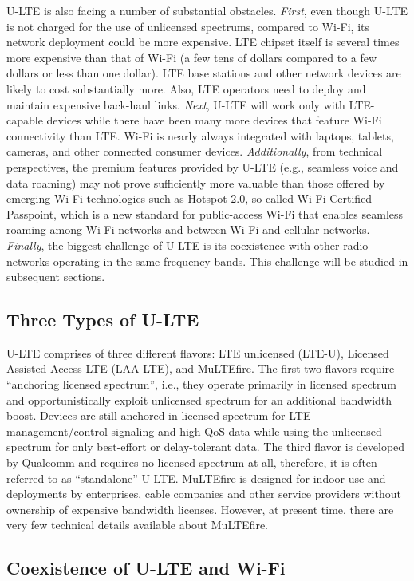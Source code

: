 \documentclass[12pt,onecolumn]{article}
\begin{document}
U-LTE is also facing a number of substantial obstacles. \textit{First}, even though U-LTE is not charged for the use of unlicensed spectrums, compared to Wi-Fi, its network deployment could be more expensive. LTE chipset itself is several times more expensive than that of Wi-Fi (a few tens of dollars compared to a few dollars or less than one dollar). LTE base stations and other network devices are likely to cost substantially more. Also, LTE operators need to deploy and maintain expensive back-haul links. \textit{Next}, U-LTE will work only with LTE-capable devices while there have been many more devices that feature Wi-Fi connectivity than LTE. Wi-Fi is nearly always integrated with laptops, tablets, cameras, and other connected consumer devices. \textit{Additionally}, from technical perspectives, the premium features provided by U-LTE (e.g., seamless voice and data roaming) may not prove sufficiently more valuable than those offered by emerging Wi-Fi technologies such as Hotspot 2.0, so-called Wi-Fi Certified Passpoint, which is a new standard for public-access Wi-Fi that enables seamless roaming among Wi-Fi networks and between Wi-Fi and cellular networks. \textit{Finally}, the biggest challenge of U-LTE is its coexistence with other radio networks operating in the same frequency bands. This challenge will be studied in subsequent sections. 

\subsection{Three Types of U-LTE}

\noindent U-LTE comprises of three different flavors: LTE unlicensed (LTE-U), Licensed Assisted Access LTE (LAA-LTE), and MuLTEfire. The first two flavors require ``anchoring licensed spectrum'', i.e., they operate primarily in licensed spectrum and opportunistically exploit unlicensed spectrum for an additional bandwidth boost. Devices are still anchored in licensed spectrum for LTE management/control signaling and high QoS data while using the unlicensed spectrum for only best-effort or delay-tolerant data. The third flavor is developed by Qualcomm and requires no licensed spectrum at all, therefore, it is often referred to as ``standalone'' U-LTE. MuLTEfire is designed for indoor use and deployments by enterprises, cable companies and other service providers without ownership of expensive bandwidth licenses. However, at present time, there are very few technical details available about MuLTEfire.

\subsection{Coexistence of U-LTE and Wi-Fi}
\end{document}
